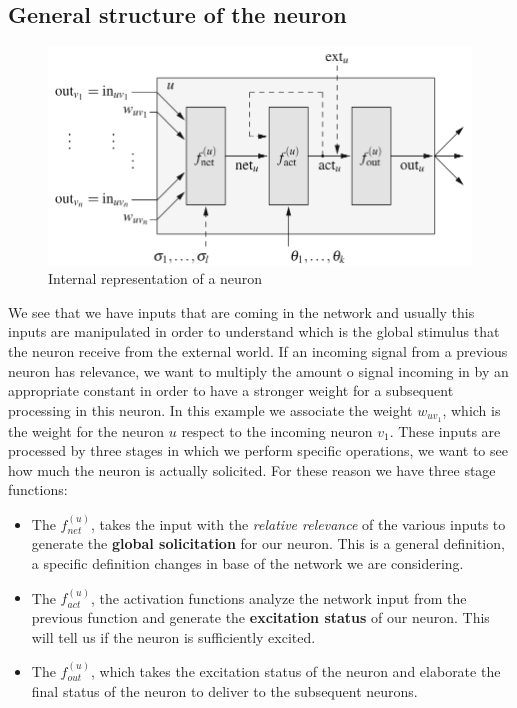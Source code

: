 \documentclass{article}
\begin{document}
\subsection{General structure of the neuron}
\begin{figure}[H]
    \centering
    \includegraphics[scale=0.5]{images/general_structure_neuron.png}
    \caption{Internal representation of a neuron}
\end{figure}
We see that we have inputs that are coming in the network and usually this inputs are
manipulated in order to understand which is the global stimulus that the neuron
receive from the external world.
\newline\newline
If an incoming signal from a previous neuron has relevance, we want to multiply the
amount o signal incoming in by an appropriate constant in order to have a stronger weight
for a subsequent processing in this neuron.
\newline\newline
In this example we associate the weight $w_{uv_1}$, which is the weight for the neuron
$u$ respect to the incoming neuron $v_1$.
\newline\newline
These inputs are processed by three stages in which we perform specific operations, we want
to see how much the neuron is actually solicited. For these reason we have three
stage functions:
\begin{itemize}
    \item The $f_{net}^{(u)}$, takes the input with the \textit{relative relevance} of the
          various inputs to generate the \textbf{global solicitation} for our neuron. This is a general
          definition, a specific definition changes in base of the network we are considering.

    \item The $f_{act}^{(u)}$, the activation functions analyze the network input from the
          previous function and generate the \textbf{excitation status} of our neuron. This will tell
          us if the neuron is sufficiently excited.

    \item The $f_{out}^{(u)}$, which takes the excitation status of the neuron and elaborate
          the final status of the neuron to deliver to the subsequent neurons.
\end{itemize}
\end{document}
